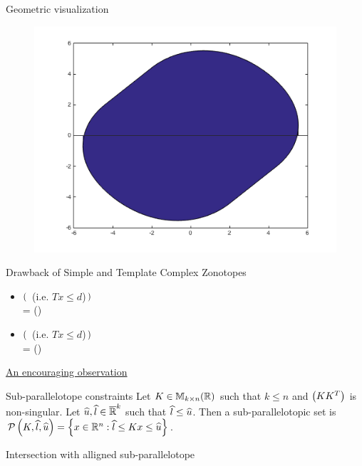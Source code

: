 \begin{frame}{Geometric visualization}
\begin{minipage}{0.45\textwidth}
\begin{figure}
\includegraphics[scale=0.2]{fig/CZhull.png}
\end{figure}
\end{minipage}
\end{frame}



\begin{frame}{Drawback of Simple and Template Complex Zonotopes}
\begin{itemize}
\item $\left(\right.$ \eqncol{$\bigcap$}  (i.e. {\color{teal}$Tx\leq d$})$\left.\right)$\\ = ()
\item $\left(\right.$ \eqncol{$\bigcap$}  (i.e. {\color{teal}$Tx\leq d$})$\left.\right)$\\= ()
\end{itemize}
\pause
{\color{violet}{\bf However!} \underline{An encouraging observation}}
\begin{exampleblock}{Sub-parallelotope constraints}
Let $K\in\mathbb{M}_{k\times n}(\mathbb{R})$ such that $k\leq n$ and $\left(KK^T\right)$ is
non-singular.  Let
  $\widehat{u},\widehat{l}\in\mathbb{\overline{R}}^k$ such that $\widehat{l}\leq\widehat{u}$.  Then
  a sub-parallelotopic set is $\mathcal{P}\left(K,\widehat{l},\widehat{u}\right) = \left\{x\in\mathbb{R}^n: \widehat{l}\leq Kx \leq \widehat{u}\right\}$.
\end{exampleblock}
\begin{block}{Intersection with alligned sub-parallelotope}
\textcol{\[\bm{
\zon{\pinv{K}}{l}{u} \bigcap \sptope{K}{\wh{l}}{\wh{u}}
= \zon{\pinv{K}}{l\bigvee \wh{l}}{u\bigwedge \wh{u}}}
\]}
\end{block}
\end{frame}

